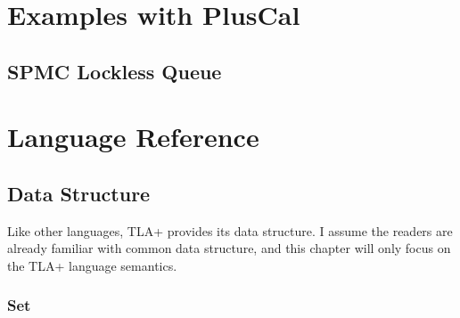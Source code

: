 \documentclass{report}
\begin{document}
\part{Examples with PlusCal}



\chapter{SPMC Lockless Queue}

\part{Language Reference}

\chapter{Data Structure}




Like other languages, TLA+ provides its data structure. I assume the readers are
already familiar with common data structure, and this chapter will only focus on
the TLA+ language semantics. 

\section{Set}
\end{document}
